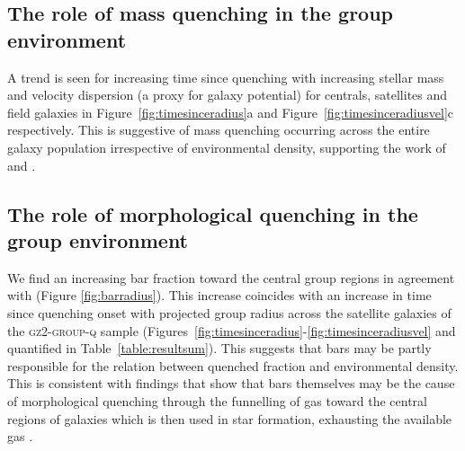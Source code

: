 \documentclass[useAMS,usenatbib]{mn2e}
\begin{document}
\subsection{The role of mass quenching in the group environment}\label{sec:rolemassenv}

A trend is seen for increasing time since quenching with increasing stellar mass and velocity dispersion (a proxy for galaxy potential) for centrals, satellites and field galaxies in Figure~\ref{fig:timesinceradius}a and Figure~\ref{fig:timesinceradiusvel}c respectively. This is suggestive of mass quenching occurring across the entire galaxy population irrespective of environmental density, supporting the work of \citet{peng10, peng12, Gabor10} and \citet{darvish16}.

\subsection{The role of morphological quenching in the group environment}\label{sec:rolemorphenv}

We find an increasing bar fraction toward the central group regions in agreement with \cite{skibba12} (Figure \ref{fig:barradius}). This increase coincides with an increase in time since quenching onset with projected group radius across the satellite galaxies of the \textsc{gz2-group-q} sample (Figures~\ref{fig:timesinceradius}-\ref{fig:timesinceradiusvel} and quantified in Table~\ref{table:resultsum}). This suggests that bars may be partly responsible for the relation between quenched fraction and environmental density. This is consistent with findings that show that bars themselves may be the cause of morphological quenching through the funnelling of gas toward the central regions of galaxies \citep{athanassoula92b, sheth05} which is then used in star formation, exhausting the available gas \citep[][and see Section~\ref{sec:morphquench}]{masters12a}.

\end{document}
